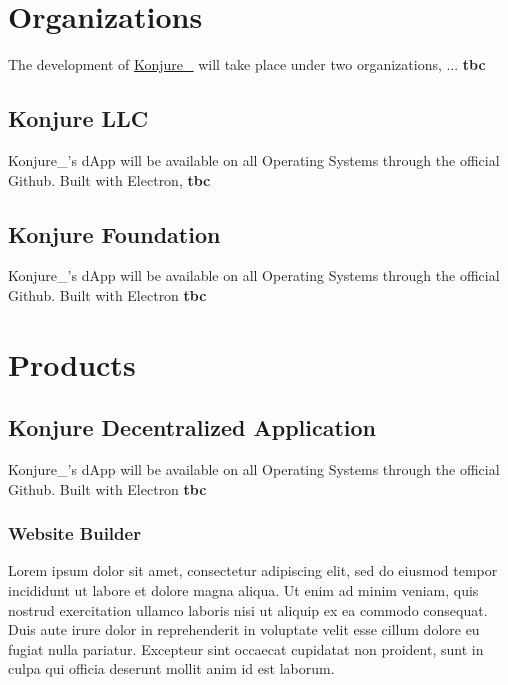 \documentclass{article}
\def \website {https://konjure.org}
\newcommand\tab[1][1cm]{\hspace*{#1}}
\newcommand{\konjure}{\href{\website}{Konjure\_\texttrademark}\xspace}
\begin{document}

\section{Organizations}

\tab The development of \konjure will take place under two organizations, ... \textbf{tbc}

\subsection{Konjure LLC}

\tab Konjure\_{'}s dApp will be available on all Operating Systems through the official Github. Built with Electron, \textbf{tbc}

\subsection{Konjure Foundation}

\tab Konjure\_{'}s dApp will be available on all Operating Systems through the official Github. Built with Electron \textbf{tbc}


\section{Products}
\subsection{Konjure Decentralized Application}

\tab Konjure\_{'}s dApp will be available on all Operating Systems through the official Github. Built with Electron \textbf{tbc}

\subsubsection{Website Builder}

\tab Lorem ipsum dolor sit amet, consectetur adipiscing elit, sed do eiusmod tempor incididunt ut labore et dolore magna aliqua. Ut enim ad minim veniam, quis nostrud exercitation ullamco laboris nisi ut aliquip ex ea commodo consequat. Duis aute irure dolor in reprehenderit in voluptate velit esse cillum dolore eu fugiat nulla pariatur. Excepteur sint occaecat cupidatat non proident, sunt in culpa qui officia deserunt mollit anim id est laborum.
\end{document}
